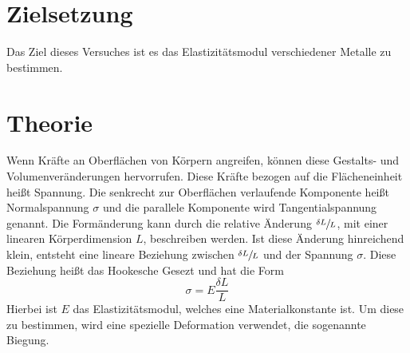 \section{Zielsetzung}
Das Ziel dieses Versuches ist es das Elastizitätsmodul verschiedener Metalle zu bestimmen.

\section{Theorie}
\label{sec:Theorie}

Wenn Kräfte an Oberflächen von Körpern angreifen, können diese Gestalts- und Volumenveränderungen hervorrufen.
Diese Kräfte bezogen auf die Flächeneinheit heißt Spannung.
Die senkrecht zur Oberflächen verlaufende Komponente heißt Normalspannung $\sigma$ und die parallele Komponente wird Tangentialspannung genannt.
Die Formänderung kann durch die relative Änderung $\sfrac{\delta L }{L}$, mit einer linearen Körperdimension $L$, beschreiben werden.
Ist diese Änderung hinreichend klein, entsteht eine lineare Beziehung zwischen $\sfrac{\delta L }{L}$ und der Spannung $\sigma$.
Diese Beziehung heißt das Hookesche Gesezt und hat die Form
\begin{equation}
    \sigma = E \frac{\delta L}{L}
\end{equation}
Hierbei ist $E$ das Elastizitätsmodul, welches eine Materialkonstante ist.
Um diese zu bestimmen, wird eine spezielle Deformation verwendet, die sogenannte Biegung.
